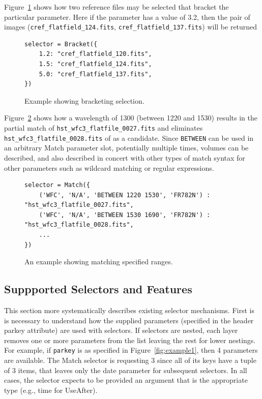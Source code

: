 \documentclass[final,authoryear,5p,times,twocolumn]{elsarticle}
\begin{document}
Figure~\ref{fig:example3} shows how two reference files may be selected
that bracket the particular parameter. Here if the parameter has a value 
of 3.2, then the pair of images 
(\texttt{cref\_flatfield\_124.fits}, \texttt{cref\_flatfield\_137.fits}) will be returned

\begin{figure}
\begin{mdframed}
\begin{verbatim}
selector = Bracket({
    1.2: "cref_flatfield_120.fits",
    1.5: "cref_flatfield_124.fits",
    5.0: "cref_flatfield_137.fits",
})
\end{verbatim}
\end{mdframed}
\caption{Example showing bracketing selection.}
\label{fig:example3}
\end{figure}

Figure~\ref{fig:example4} shows how a
wavelength of 1300 (between 1220 and 1530) results in the partial match 
of \texttt{hst\_wfc3\_flatfile\_0027.fits} and eliminates 
\texttt{hst\_wfc3\_flatfile\_0028.fits}
of as a candidate.   Since \texttt{BETWEEN}
can be used in an arbitrary Match parameter
slot,  potentially multiple times,  volumes can be described, and also
described in concert with other types of match syntax for other parameters
such as wildcard matching or regular expressions.

\begin{figure}
\begin{mdframed}
\begin{verbatim}
selector = Match({
    ('WFC', 'N/A', 'BETWEEN 1220 1530', 'FR782N') :  "hst_wfc3_flatfile_0027.fits",
    ('WFC', 'N/A', 'BETWEEN 1530 1690', 'FR782N') :  "hst_wfc3_flatfile_0028.fits",
    ...
})
\end{verbatim}
\end{mdframed}
\caption{An example showing matching specified ranges.}
\label{fig:example4}
\end{figure}

\subsection{Suppported Selectors and Features}

This section more systematically describes existing selector mechanisms. 
First is is necessary to understand how the supplied parameters (specified
in the header parkey attribute) are used with selectors. If selectors are 
nested, each layer removes one or more parameters from the list leaving 
the rest for lower nestings. For example, if \texttt{parkey} is as specified in
Figure~\ref{fig:example1}, then 4 parameters are available. The Match 
selector is requesting 3 since all of its keys have a tuple of 3 items,
that leaves only the date parameter for subsequent selectors.
In all cases, the selector expects to be provided an argument that is the 
appropriate type (e.g., time for UseAfter). 
\end{document}
